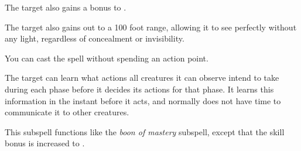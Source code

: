 
The target also gains a  bonus to .







The target also gains  out to a 100 foot range, allowing it to see perfectly without any light, regardless of concealment or invisibility.






You can cast the spell without spending an action point.






The target can learn what actions all creatures it can observe intend to take during each phase before it decides its actions for that phase.
It learns this information in the instant before it acts, and normally does not have time to communicate it to other creatures.







This subspell functions like the \textit{boon of mastery} subspell, except that the skill bonus is increased to .





